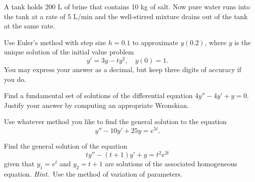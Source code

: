 \documentclass[11pt]{exam}
\begin{document}
\begin{questions}  

    \question A tank holds \num{200} \si{\liter} of brine that contains \num{10} \si{\kilo\gram} of salt. Now pure water runs into the tank at a rate of \num{5} \si[per-mode=symbol]{\liter\per\minute} and the well-stirred mixture drains out of the tank at the same rate.


    \question[15] Use Euler's method with step size $h = 0.1$ to approximate $y(0.2)$, where $y$ is the unique solution of the initial value problem
    \[
        y' = 3y - ty^2, \quad y(0) = 1.
    \]
    You may express your answer as a decimal, but keep three digits of accuracy if you do. 


    \question[15] Find a fundamental set of solutions of the differential equation $4y'' - 4y' + y = 0$. Justify your answer by computing an appropriate Wronskian.

    \question Use whatever method you like to find the general solution to the equation
    \[
        y'' - 10y' + 25y = e^{5t}.
    \]


    \question Find the general solution of the equation 
        \[
            ty'' - (t+1)y' + y = t^2 e^{2t}
        \]
    given that $y_1 = e^t$ and $y_2 = t+1$ are solutions of the associated homogeneous equation. \emph{Hint.}~Use the method of variation of parameters. 



\end{questions}
\end{document}
